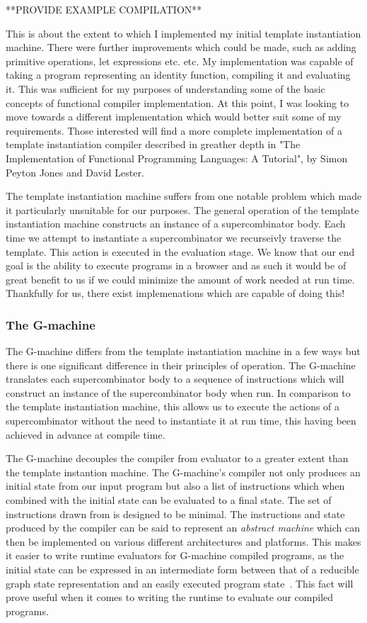 **PROVIDE EXAMPLE COMPILATION**

This is about the extent to which I implemented my initial
template instantiation machine. There were further 
improvements which could be made, such as adding primitive
operations, let expressions etc. etc. My implementation was
capable of taking a program representing an identity 
function, compiling it and evaluating it. This was 
sufficient for my purposes of understanding some of the
basic concepts of functional compiler implementation. At
this point, I was looking to move towards a different
implementation which would better suit some of my 
requirements. Those interested will find a more complete
implementation of a template instantiation compiler 
described in greather depth in "The Implementation of Functional 
Programming Languages: A Tutorial", by Simon Peyton Jones
and David Lester.

The template instantiation machine suffers from one notable
problem which made it particularly unsuitable for our
purposes. The general operation of the template instantiation
machine constructs an instance of a supercombinator body.
Each time we attempt to instantiate a supercombinator we
recurseivly traverse the template. This action is executed
in the evaluation stage. We know that our end goal is the
ability to execute programs in a browser and as such it would
be of great benefit to us if we could minimize the amount of
work needed at run time. Thankfully for us, there exist
implemenations which are capable of doing this!

\subsubsection{The G-machine}
The G-machine differs from the template instantiation machine
in a few ways but there is one significant difference in 
their principles of operation. The G-machine translates each
supercombinator body to a sequence of instructions which will
construct an instance of the supercombinator body when run.
In comparison to the template instantiation machine, this
allows us to execute the actions of a supercombinator without
the need to instantiate it at run time, this having been
achieved in advance at compile time. 

The G-machine decouples the compiler from evaluator to a
greater extent than the template instantion machine. The
G-machine's compiler not only produces an initial state from
our input program but also a list of instructions which when
combined with the initial state can be evaluated to a final
state. The set of instructions drawn from is designed to be
minimal. The instructions and state produced
by the compiler can be said to represent an \emph{abstract
machine} which can then be implemented on various different
architectures and platforms. This makes it easier to write
runtime evaluators for G-machine compiled programs, as the
initial state can be expressed in an intermediate form 
between that of a reducible graph state representation 
and an easily executed program state~\cite[pp.294]{SPJ}. 
This fact will prove useful when it comes to writing the
runtime to evaluate our compiled programs.

